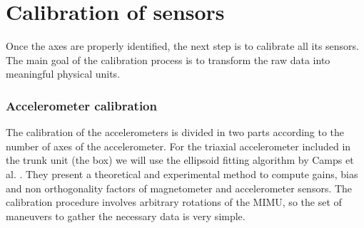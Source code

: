 \chapter{Calibration of sensors}
\label{ch:calibration}

\indent \indent Once the axes are properly identified, the next step is to calibrate all its sensors. The main goal of the calibration process is to transform the raw data into meaningful physical units. 

\subsection{Accelerometer calibration}
\label{subsec:acc_calibration}

\indent \indent The calibration of the accelerometers is divided in two parts according to the number of axes of the accelerometer. For the triaxial accelerometer included in the trunk unit (the box) we will use the ellipsoid fitting algorithm by Camps et al. \cite{camps_numerical_2009}. They present a theoretical and experimental method to compute gains, bias and non orthogonality factors of magnetometer and acce\-le\-ro\-me\-ter sensors. The calibration procedure involves arbitrary rotations of the MIMU, so the set of maneuvers to gather the necessary data is very simple.
